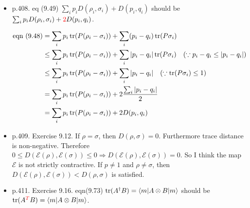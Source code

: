 \begin{itemize}
    \item p.408. eq (9.49) $\sum_i p_i D(\rho_i, \sigma_i) + D(p_i, q_i)$ should be $\sum_i p_i D(\rho_i, \sigma_i) + \textcolor[rgb]{1,0,0}{2}D(p_i, q_i)$.

    \begin{align*}
    \text{eqn } (9.48) 
        &= \sum_i p_i \operatorname{tr} (P(\rho_i - \sigma_i)) + \sum_i (p_i - q_i) \operatorname{tr} (P \sigma_i)\\
        &\leq \sum_i p_i \operatorname{tr} (P(\rho_i - \sigma_i)) + \sum_i |p_i - q_i| \operatorname{tr} (P \sigma_i)~~~(\because p_i - q_i \leq |p_i - q_i|)\\
        &\leq \sum_i p_i \operatorname{tr} (P(\rho_i - \sigma_i)) + \sum_i |p_i - q_i|~~~(\because \operatorname{tr} (P \sigma_i) \leq 1)\\
        &= \sum_i p_i \operatorname{tr} (P(\rho_i - \sigma_i)) + 2 \frac{\sum_i |p_i - q_i|}{2}\\
        &= \sum_i p_i \operatorname{tr} (P(\rho_i - \sigma_i)) + 2D(p_i, q_i)
    \end{align*}
%
    \item p.409. Exercise 9.12. If $\rho = \sigma$, then $D(\rho, \sigma) = 0$. Furthermore trace distance is non-negative. Therefore $0 \leq D(\mathcal{E}(\rho), \mathcal{E}(\sigma)) \leq 0 \Rightarrow D(\mathcal{E}(\rho), \mathcal{E}(\sigma))  = 0$. So I think the map $\mathcal{E}$ is not strictly contractive. If $p \neq 1$ and $\rho \neq \sigma$, then $D(\mathcal{E}(\rho), \mathcal{E}(\sigma)) < D(\rho, \sigma)$ is satisfied.
%
    \item p.411. Exercise 9.16. eqn(9.73) $\operatorname{tr} (A^\dagger B) = \braket{m | A \otimes B | m}$ should be $\operatorname{tr} (A^{\textcolor{red}{T}} B) = \braket{m | A \otimes B | m}$.


\end{itemize}
